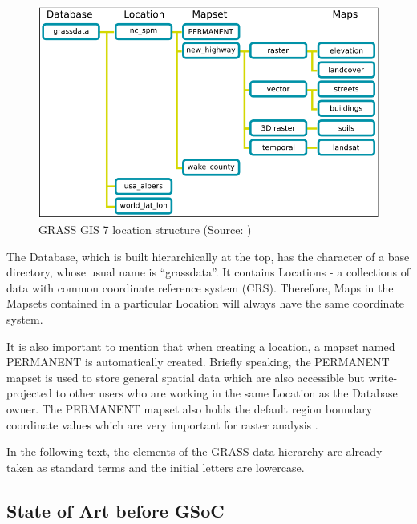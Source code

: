 \documentclass[a4paper,10pt,twoside]{article}
\begin{document}
\vspace{0.3cm}
\begin{figure}[hbt!]
\begin{center}
\includegraphics[width=14cm]{../pictures/grass_data_hiearchy.png} 
\caption[GRASS GIS 7 location structure]{GRASS GIS 7 location structure (Source: \cite{hierarchy})}
\label{fig:grass_data_hierarchy}
\end{center}
\end{figure}

\noindent The Database, which is built hierarchically at the top, has the character of a base directory, whose usual name is ``grassdata''. It contains Locations - a collections of data with common coordinate reference system (CRS). Therefore, Maps in the Mapsets contained in a particular Location will always have the same coordinate system.

It is also important to mention that when creating a location, a mapset named PERMANENT is automatically created. Briefly speaking, the PERMANENT mapset is used to store general spatial data which are also accessible but write-projected to other users who are working in the same Location as the Database owner. The PERMANENT mapset also holds the default region boundary coordinate values which are very important for raster analysis \cite{hierarchy}. 

In the following text, the elements of the GRASS data hierarchy are already taken as standard terms and the initial letters are lowercase.

\newpage
\vspace*{-1cm}
\subsection{State of Art before GSoC}
\label{sec:beforeGSoC}
\end{document}
